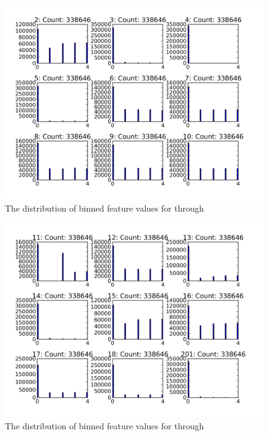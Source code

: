 \begin{figure}[ht!]
  \caption{The distribution of binned feature values for  through }\label{fig:features_bin_5_2_10}
  \centering
    \includegraphics[width=1.0\textwidth]{figures/feature_distributions/features_bin_5_2_10.png}
\end{figure}

\begin{figure}[ht!]
  \caption{The distribution of binned feature values for  through }\label{fig:features_bin_5_11_19}
  \centering
    \includegraphics[width=1.0\textwidth]{figures/feature_distributions/features_bin_5_11_19.png}
\end{figure}

